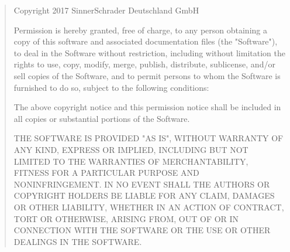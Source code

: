 \begin{quote}
Copyright 2017 SinnerSchrader Deutschland GmbH

Permission is hereby granted, free of charge, to any person obtaining a copy of this software and associated documentation files (the "Software"), to deal in the Software without restriction, including without limitation the rights to use, copy, modify, merge, publish, distribute, sublicense, and/or sell copies of the Software, and to permit persons to whom the Software is furnished to do so, subject to the following conditions:

The above copyright notice and this permission notice shall be included in all copies or substantial portions of the Software.

THE SOFTWARE IS PROVIDED "AS IS", WITHOUT WARRANTY OF ANY KIND, EXPRESS OR IMPLIED, INCLUDING BUT NOT LIMITED TO THE WARRANTIES OF MERCHANTABILITY, FITNESS FOR A PARTICULAR PURPOSE AND NONINFRINGEMENT. IN NO EVENT SHALL THE AUTHORS OR COPYRIGHT HOLDERS BE LIABLE FOR ANY CLAIM, DAMAGES OR OTHER LIABILITY, WHETHER IN AN ACTION OF CONTRACT, TORT OR OTHERWISE, ARISING FROM, OUT OF OR IN CONNECTION WITH THE SOFTWARE OR THE USE OR OTHER DEALINGS IN THE SOFTWARE.
\end{quote}\cite{license}
